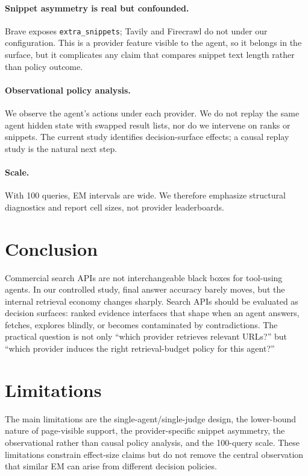 \documentclass[11pt]{article}
\begin{document}
\paragraph{Snippet asymmetry is real but confounded.} Brave exposes \texttt{extra\_snippets}; Tavily and Firecrawl do not under our configuration. This is a provider feature visible to the agent, so it belongs in the surface, but it complicates any claim that compares snippet text length rather than policy outcome.

\paragraph{Observational policy analysis.} We observe the agent's actions under each provider. We do not replay the same agent hidden state with swapped result lists, nor do we intervene on ranks or snippets. The current study identifies decision-surface effects; a causal replay study is the natural next step.

\paragraph{Scale.} With 100 queries, EM intervals are wide. We therefore emphasize structural diagnostics and report cell sizes, not provider leaderboards.

\section{Conclusion}

Commercial search APIs are not interchangeable black boxes for tool-using agents. In our controlled study, final answer accuracy barely moves, but the internal retrieval economy changes sharply. Search APIs should be evaluated as decision surfaces: ranked evidence interfaces that shape when an agent answers, fetches, explores blindly, or becomes contaminated by contradictions. The practical question is not only ``which provider retrieves relevant URLs?'' but ``which provider induces the right retrieval-budget policy for this agent?''

\section*{Limitations}
The main limitations are the single-agent/single-judge design, the lower-bound nature of page-visible support, the provider-specific snippet asymmetry, the observational rather than causal policy analysis, and the 100-query scale. These limitations constrain effect-size claims but do not remove the central observation that similar EM can arise from different decision policies.
\end{document}
